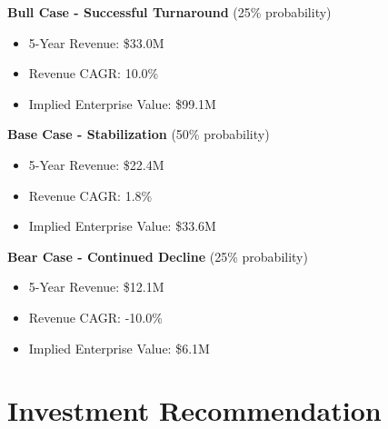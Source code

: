 \documentclass[11pt,a4paper]{article}
\begin{document}
\textbf{Bull Case - Successful Turnaround} (25\% probability)

\begin{itemize}
\itemsep0.2em
\item 5-Year Revenue: \$33.0M
\item Revenue CAGR: 10.0\%
\item Implied Enterprise Value: \$99.1M
\end{itemize}

\vspace{0.2cm}

\textbf{Base Case - Stabilization} (50\% probability)

\begin{itemize}
\itemsep0.2em
\item 5-Year Revenue: \$22.4M
\item Revenue CAGR: 1.8\%
\item Implied Enterprise Value: \$33.6M
\end{itemize}

\vspace{0.2cm}

\textbf{Bear Case - Continued Decline} (25\% probability)

\begin{itemize}
\itemsep0.2em
\item 5-Year Revenue: \$12.1M
\item Revenue CAGR: -10.0\%
\item Implied Enterprise Value: \$6.1M
\end{itemize}

\vspace{0.2cm}


\newpage

\section{Investment Recommendation}

\begin{center}
\end{center}

\vspace{0.5cm}
\end{document}
